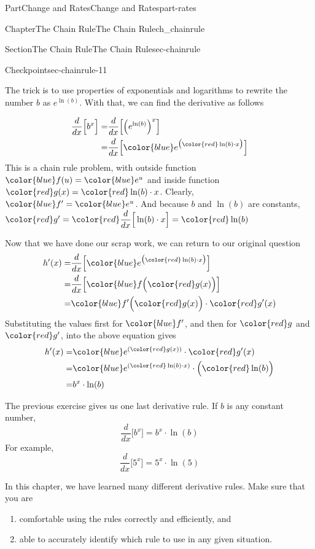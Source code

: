 \documentclass[oneside,10pt,]{tufte-book}
\numberwithin{equation}{chapter}
\newcommand{\red}[1]{   {\color{red}   #1}   }
\newcommand{\blue}[1]{  {\color{blue}  #1}  }
\newcommand{\ddx}[1]{ \dfrac{d}{dx} \Big[ #1 \Big]  }
\newcommand{\amp}{&}
\begin{document}
\begin{partptx}{Part}{Change and Rates}{}{Change and Rates}{}{}{part-rates}
\begin{chapterptx}{Chapter}{The Chain Rule}{}{The Chain Rule}{}{}{ch_chainrule}
\begin{sectionptx}{Section}{The Chain Rule}{}{The Chain Rule}{}{}{sec-chainrule}
\begin{inlineexercise}{Checkpoint}{}{sec-chainrule-11}
\par
The trick is to use properties of exponentials and logarithms to rewrite the number \(b\) as \(e^{\ln(b)}\). With that, we can find the derivative as follows%
\par
%
\begin{align*}
\ddx{ b^{x} } = \amp \ddx{ \Big(e^{\ln(b)}\Big)^x } \\
= \amp \ddx{ \blue {e^{\big(\red{\ln(b)\cdot x}\big)} } } 
\end{align*}
This is a chain rule problem, with outside function \(\blue{f(u)}=\blue{e^u}\) and inside function \(\red{g(x)} = \red{\ln(b)\cdot x}\). Clearly, \(\blue{f'} = \blue{e^u}\). And because  \(b\) and \(\ln(b)\) are constants, \(\red{g'} = \red{\ddx{\ln(b)\cdot x}} = \red{\ln(b)}\)%
\par
Now that we have done our scrap work, we can return to our original question%
\begin{align*}
h'(x) = \amp 
\ddx{\blue{ e^{\big(\red{\ln(b)\cdot x}\big)} } }  \\
= \amp \ddx{ \blue{f\Big( \red{g(x)} \Big) } }\\
= \amp \blue{f'\Big( \red{g(x)}\Big)}\cdot \red{g'(x)}
\end{align*}
Substituting the values first for \(\blue{f'}\), and then for  \(\red{g}\) and \(\red{g'}\), into the above equation gives%
\begin{align*}
h'(x) = \amp 
\blue{ e^{(\red{g(x)})} }\cdot \red{g'(x)}\\
= \amp 
\blue{ e^{(\red{\ln(b)\cdot x})} }\cdot \Big(\red{\ln(b)}\Big)\\
= \amp b^x \cdot \ln(b)
\end{align*}
%
\end{inlineexercise}%
The previous exercise gives us one last derivative rule.  If \(b\) is any constant number,%
\begin{equation*}
\ddx{b^x} = b^x \cdot \ln(b)
\end{equation*}
For example,%
\begin{equation*}
\ddx{5^x} = 5^x \cdot \ln(5)
\end{equation*}
%
\par
In this chapter, we have learned many different derivative rules.  Make sure that you are%
\begin{enumerate}
\item{}comfortable using the rules correctly and efficiently, and%
\item{}able to accurately identify which rule to use in any given situation.%

\end{enumerate}
\end{sectionptx}
\end{chapterptx}
\end{partptx}
\end{document}
